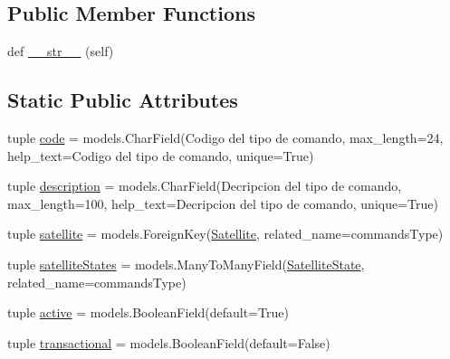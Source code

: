 \subsection*{Public Member Functions}
\begin{DoxyCompactItemize}
\item 
def \hyperlink{class_ground_segment_1_1models_1_1_command_type_1_1_command_type_a49cb55136b78a70beb2029c2831329c8}{\+\_\+\+\_\+str\+\_\+\+\_\+} (self)
\end{DoxyCompactItemize}
\subsection*{Static Public Attributes}
\begin{DoxyCompactItemize}
\item 
tuple \hyperlink{class_ground_segment_1_1models_1_1_command_type_1_1_command_type_ac77c0cba489bd7a6fdaa1b1708874788}{code} = models.\+Char\+Field(\textquotesingle{}Codigo del tipo de comando\textquotesingle{}, max\+\_\+length=24, help\+\_\+text=\textquotesingle{}Codigo del tipo de comando\textquotesingle{}, unique=True)
\item 
tuple \hyperlink{class_ground_segment_1_1models_1_1_command_type_1_1_command_type_aaa9751ec3f77c395d30ccee44158b402}{description} = models.\+Char\+Field(\textquotesingle{}Decripcion del tipo de comando\textquotesingle{}, max\+\_\+length=100, help\+\_\+text=\textquotesingle{}Decripcion del tipo de comando\textquotesingle{}, unique=True)
\item 
tuple \hyperlink{class_ground_segment_1_1models_1_1_command_type_1_1_command_type_ac4a5af6d55267d8927df6f12056ba3ca}{satellite} = models.\+Foreign\+Key(\hyperlink{class_ground_segment_1_1models_1_1_satellite_1_1_satellite}{Satellite}, related\+\_\+name=\textquotesingle{}commands\+Type\textquotesingle{})
\item 
tuple \hyperlink{class_ground_segment_1_1models_1_1_command_type_1_1_command_type_a7d70980b38a0c4a182eb5eaf5e03a682}{satellite\+States} = models.\+Many\+To\+Many\+Field(\hyperlink{class_ground_segment_1_1models_1_1_satellite_state_1_1_satellite_state}{Satellite\+State}, related\+\_\+name=\textquotesingle{}commands\+Type\textquotesingle{})
\item 
tuple \hyperlink{class_ground_segment_1_1models_1_1_command_type_1_1_command_type_a4fd1cf4f72c8b1bfd70917acaab44cfc}{active} = models.\+Boolean\+Field(default=True)
\item 
tuple \hyperlink{class_ground_segment_1_1models_1_1_command_type_1_1_command_type_a3cda63f48be91dcfde6d1ca9aa4cabec}{transactional} = models.\+Boolean\+Field(default=False)

\end{DoxyCompactItemize}
